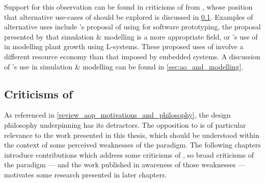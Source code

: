 Support for this observation can be found in criticisms of \aop{} from
\citet{steimann06paradoxical}, whose position that alternative use-cases of
\aspectorientation{} should be explored is discussed in
\cref{subsec:aop-criticisms}. Examples of alternative uses include
\citeauthor{popovici2002PROSE}'s proposal of using \aspectorientation{} for
software prototyping, the proposal presented by \citet{gulyas1999use} that
simulation \& modelling is a more appropriate field, or \citet{Cieslak_2011}'s
use of \aspectorientation{} in modelling plant growth using L-systems. These
proposed uses of \aspectorientation{} involve a different resource economy than
that imposed by embedded systems. A discussion of \aspectorientation{}'s use in
simulation \& modelling can be found in \cref{sec:ao_and_modelling}.


\subsection{Criticisms of \AspectOrientation{}}
\label{subsec:aop-criticisms}

As referenced in \cref{review_aop_motivations_and_philosophy}, the design
philosophy underpinning \aop{} has its detractors. The opposition to
\aspectorientation{} is of particular relevance to the work presented in this
thesis, which should be understood within the context of some perceived
weaknesses of the paradigm. The following chapters introduce contributions which
address some criticisms of \aop{}, so broad criticisms of the paradigm --- and
the work published in awareness of those weaknesses --- motivates some research
presented in later chapters.


